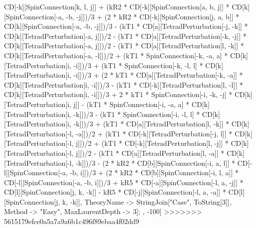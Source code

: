 CD[-k][SpinConnection[k, l, j]] + (kR2 * CD[-k][SpinConnection[a, b, j]] * CD[k][SpinConnection[-a, -b, -j]])/3 + (2 * kR2 * CD[-k][SpinConnection[j, a, b]] * CD[k][SpinConnection[-a, -b, -j]])/3 - (kT1 * CD[a][TetradPerturbation[-j, -k]] * CD[k][TetradPerturbation[-a, j]])/2 - (kT1 * CD[a][TetradPerturbation[-k, -j]] * CD[k][TetradPerturbation[-a, j]])/2 - (kT1 * CD[a][TetradPerturbation[l, -k]] * CD[k][TetradPerturbation[-a, -l]])/2 + (kT1 * SpinConnection[-k, -a, a] * CD[k][TetradPerturbation[i, -i]])/3 + (kT1 * SpinConnection[-k, -l, l] * CD[k][TetradPerturbation[i, -i]])/3 + (2 * kT1 * CD[a][TetradPerturbation[-k, -a]] * CD[k][TetradPerturbation[i, -i]])/3 - (kT1 * CD[-k][TetradPerturbation[l, -l]] * CD[k][TetradPerturbation[i, -i]])/3 + 2 * kT1 * SpinConnection[-i, -k, -j] * CD[k][TetradPerturbation[i, j]] - (kT1 * SpinConnection[-i, -a, a] * CD[k][TetradPerturbation[i, -k]])/3 - (kT1 * SpinConnection[-i, -l, l] * CD[k][TetradPerturbation[i, -k]])/3 + (kT1 * CD[a][TetradPerturbation[l, -k]] * CD[k][TetradPerturbation[-l, -a]])/2 + (kT1 * CD[-k][TetradPerturbation[-j, l]] * CD[k][TetradPerturbation[-l, j]])/2 + (kT1 * CD[-k][TetradPerturbation[l, -j]] * CD[k][TetradPerturbation[-l, j]])/2 - (kT1 * CD[a][TetradPerturbation[l, -a]] * CD[k][TetradPerturbation[-l, -k]])/3 - (2 * kR2 * CD[b][SpinConnection[-i, a, l]] * CD[-l][SpinConnection[-a, -b, i]])/3 + (2 * kR2 * CD[b][SpinConnection[-i, l, a]] * CD[-l][SpinConnection[-a, -b, i]])/3 + kR5 * CD[-a][SpinConnection[-l, a, -j]] * CD[l][SpinConnection[j, k, -k]] - kR5 * CD[-j][SpinConnection[-l, a, -a]] * CD[l][SpinConnection[j, k, -k]], TheoryName -> StringJoin["Case", ToString[3]], Method -> "Easy", MaxLaurentDepth -> 3]; , -100]
>>>>>>> 5615179efce0a5a7a9a6b1c496f89ebaa4f02dd9
